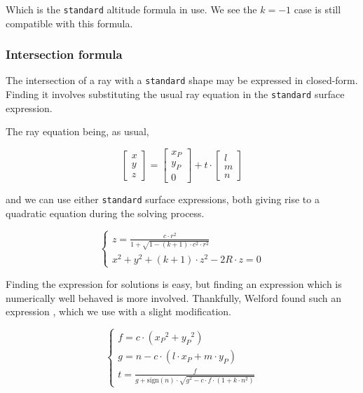Which is the \lstinline{standard} altitude formula in use. We see the $k=-1$
case is still compatible with this formula.

\subsubsection{Intersection formula}
The intersection of a ray with a \lstinline{standard} shape may be expressed
in closed-form. Finding it involves substituting the usual ray equation in
the \lstinline{standard} surface expression.

The ray equation being, as usual,

\begin{equation}
\begin{bmatrix} x \\ y \\ z \end{bmatrix} =
\begin{bmatrix} x_P \\ y_P \\ 0 \end{bmatrix} + t \cdot
\begin{bmatrix} l \\ m \\ n \end{bmatrix}
\end{equation}

and we can use either \lstinline{standard} surface expressions, both giving
rise to a quadratic equation during the solving process.

\begin{equation} \begin{cases}
z = \frac{c \cdot r^2}{1 + \sqrt{1 - (k+1) \cdot c^2 \cdot r^2}} \\
x^2 + y^2 + (k+1) \cdot z^2 - 2R \cdot z = 0
\end{cases} \end{equation}

Finding the expression for solutions is easy, but finding an expression which
is numerically well behaved is more involved. Thankfully, Welford found such
an expression \cite{Welford:1986}, which we use with a slight modification.

\begin{equation} \begin{cases}
f = c \cdot ({x_P}^2 + {y_P}^2) \\
g = n - c \cdot (l \cdot x_P + m \cdot y_P) \\
t = \frac{f}{g + \textrm{sign}(n) \cdot
             \sqrt{g^2 - c \cdot f \cdot (1 + k \cdot n^2)}}
\end{cases} \end{equation}

